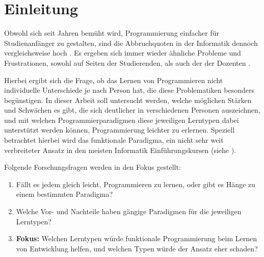 \clearpage
\section{Einleitung}
\label{sec:intro}

Obwohl sich seit Jahren bemüht wird, Programmierung einfacher für Studienanfänger zu gestalten, sind die Abbruchquoten in der Informatik dennoch vergleichsweise hoch \cite{dhzw}. 
Es ergeben sich immer wieder ähnliche Probleme und Frustrationen, sowohl auf Seiten der Studierenden, als auch der der Dozenten \cite{mcdonald}. 

Hierbei ergibt sich die Frage, ob das Lernen von Programmieren nicht individuelle Unterschiede je nach Person hat, die diese Problematiken besonders begünstigen. In dieser Arbeit soll untersucht werden, welche möglichen Stärken und Schwächen es gibt, die sich deutlicher in verschiedenen Personen auszeichnen, und mit welchen Programmierparadigmen diese jeweiligen Lerntypen dabei unterstützt werden können, Programmierung leichter zu erlernen.
Speziell betrachtet hierbei wird das funktionale Paradigma, ein nicht sehr weit verbreiteter Ansatz in den meisten Informatik Einführungskursen (siehe ).

Folgende Forschungsfragen werden in den Fokus gestellt:

\begin{enumerate}
    \item Fällt es jedem gleich leicht, Programmieren zu lernen, oder gibt es Hänge zu einem bestimmten Paradigma?
    \item Welche Vor- und Nachteile haben gängige Paradigmen für die jeweiligen Lerntypen?
    \item \textbf{Fokus:} Welchen Lerntypen würde funktionale Programmierung beim Lernen von Entwicklung helfen, und welchen Typen würde der Ansatz eher schaden?
\end{enumerate}
